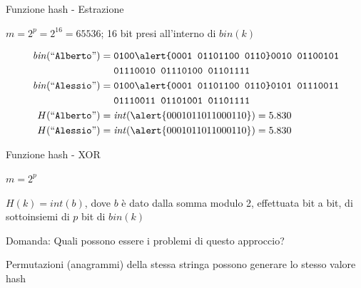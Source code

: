 \begin{frame}{Funzione hash - Estrazione}


\vspace{-9pt}
\begin{myboxtitle}[Esempio 2]
$m = 2^p = 2^{16} = 65536$; 16 bit presi all'interno di $\mathit{bin}(k)$

\begin{align*}
\mathit{bin}(``\texttt{Alberto}") = {} & \texttt{0100\alert{0001  01101100  0110}0010  01100101} \\ 
&  \texttt{01110010  01110100  01101111}\\
\mathit{bin}(``\texttt{Alessio}") = {} & \texttt{0100\alert{0001  01101100  0110}0101  01110011} \\ 
&  \texttt{01110011  01101001  01101111} \\
H(``\texttt{Alberto}") = {} & \mathit{int}(\alert{0001011011000110}) = 5.830 \\
H(``\texttt{Alessio}") = {} & \mathit{int}(\alert{0001011011000110}) = 5.830
\end{align*}
\end{myboxtitle}


\end{frame}

\begin{frame}[shrink=5]{Funzione hash - XOR}

\vspace{-9pt}
\begin{myboxtitle}[XOR]
\BIL
\item $m = 2^p$
\item $H(k) = \mathit{int}(b)$, dove $b$ è dato dalla somma modulo 2, effettuata bit a bit, di sottoinsiemi di $p$ bit di $\mathit{bin}(k)$
\EIL
\end{myboxtitle}

\begin{myboxtitle}[Problemi]
\begin{overprint}
\alert{Domanda}: Quali possono essere i problemi di questo approccio?
\BIL
\item Permutazioni (anagrammi) della stessa stringa possono generare lo stesso valore hash
\EIL
\end{overprint}
\end{myboxtitle}


\end{frame}

